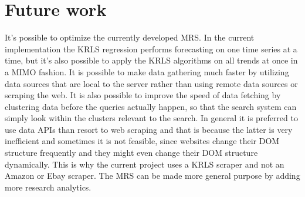\newpage
\section{Future work}
It's possible to optimize the currently developed \ac{MRS}. In the current implementation the \ac{KRLS} regression performs forecasting on one time series at a time, but it's also possible to apply the \ac{KRLS} algorithms on all trends at once in a MIMO fashion. It is possible to make data gathering much faster by utilizing data sources that are local to the server rather than using remote data sources or scraping the web. It is also possible to improve the speed of data fetching by clustering data before the queries actually happen, so that the search system can simply look within the clusters relevant to the search. In general it is preferred to use data APIs than resort to web scraping and that is because the latter is very inefficient and sometimes it is not feasible, since websites change their DOM structure frequently and they might even change their DOM structure dynamically. This is why the current project uses a \ac{KRLS} scraper and not an Amazon or Ebay scraper. The \ac{MRS} can be made more general purpose by adding more research analytics.








